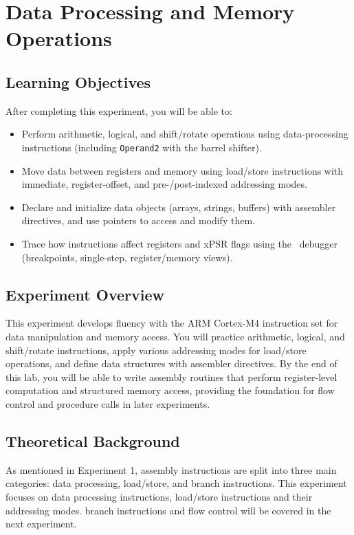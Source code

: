 \chapter{Data Processing and Memory Operations}
\section*{Learning Objectives}
After completing this experiment, you will be able to:
\begin{itemize}[nosep]
  \item Perform arithmetic, logical, and shift/rotate operations using data-processing instructions (including \texttt{Operand2} with the barrel shifter).
  \item Move data between registers and memory using load/store instructions with immediate, register-offset, and pre-/post-indexed addressing modes.
  \item Declare and initialize data objects (arrays, strings, buffers) with assembler directives, and use pointers to access and modify them.
  \item Trace how instructions affect registers and xPSR flags using the \keil\ debugger (breakpoints, single-step, register/memory views).
\end{itemize}
\section*{Experiment Overview}
This experiment develops fluency with the ARM Cortex-M4 instruction set for data manipulation and memory access. You will practice arithmetic, logical, and shift/rotate instructions, apply various addressing modes for load/store operations, and define data structures with assembler directives. By the end of this lab, you will be able to write assembly routines that perform register-level computation and structured memory access, providing the foundation for flow control and procedure calls in later experiments.

\newpage

\section{Theoretical Background}
As mentioned in Experiment 1, assembly instructions are split into three main categories: data processing, load/store, and branch instructions. This experiment focuses on data processing instructions, load/store instructions and their addressing modes. branch instructions and flow control will be covered in the next experiment.
